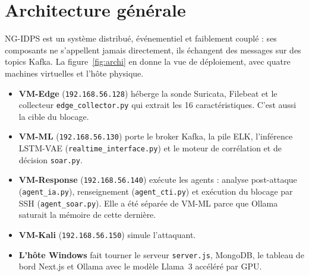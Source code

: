 \section{Architecture générale}
\label{sec:archi}

NG-IDPS est un système distribué, événementiel et faiblement couplé : ses composants ne s'appellent jamais directement, ils échangent des messages sur des topics Kafka. La figure~\ref{fig:archi} en donne la vue de déploiement, avec quatre machines virtuelles et l'hôte physique.

\begin{itemize}
\item \textbf{VM-Edge} (\texttt{192.168.56.128}) héberge la sonde Suricata, Filebeat et le collecteur \texttt{edge\_collector.py} qui extrait les 16 caractéristiques. C'est aussi la cible du blocage.
\item \textbf{VM-ML} (\texttt{192.168.56.130}) porte le broker Kafka, la pile ELK, l'inférence LSTM-VAE (\texttt{realtime\_interface.py}) et le moteur de corrélation et de décision \texttt{soar.py}.
\item \textbf{VM-Response} (\texttt{192.168.56.140}) exécute les agents : analyse post-attaque (\texttt{agent\_ia.py}), renseignement (\texttt{agent\_cti.py}) et exécution du blocage par SSH (\texttt{agent\_soar.py}). Elle a été séparée de VM-ML parce que Ollama saturait la mémoire de cette dernière.
\item \textbf{VM-Kali} (\texttt{192.168.56.150}) simule l'attaquant.
\item \textbf{L'hôte Windows} fait tourner le serveur \texttt{server.js}, MongoDB, le tableau de bord Next.js et Ollama avec le modèle Llama~3 accéléré par GPU.
\end{itemize}

